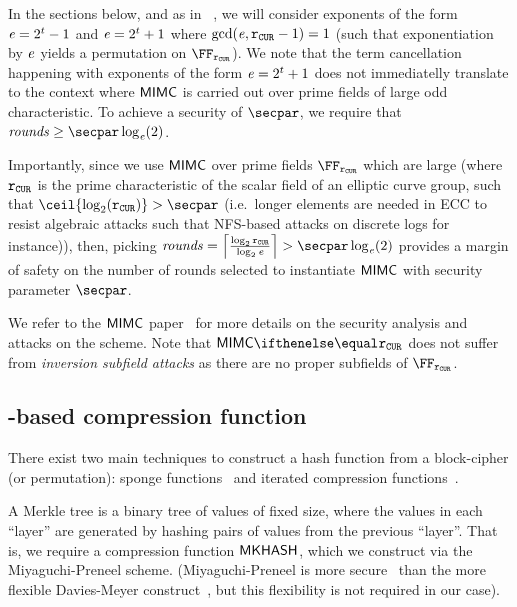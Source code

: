 \medskip

In the sections below, and as in ~\cite{albrecht2016mimc}, we will consider exponents of the form $\mathit{e}{} = 2^t-1$ and $\mathit{e}{} = 2^t+1$ where $\gcd(\mathit{e}{}, \mathtt{r_{CUR}}-1) = 1$ (such that exponentiation by $\mathit{e}{}$ yields a permutation on $\FFx{\rCURVE}$). We note that the term cancellation happening with exponents of the form $\mathit{e}{} = 2^t+1$ does not immediatelly translate to the context where $\mathsf{MIMC{}}$ is carried out over prime fields of large odd characteristic. To achieve a security of $\secpar$, we require that $\rounds \geq \secpar \log_{\exponent}(2)$.

Importantly, since we use $\mathsf{MIMC{}}$ over prime fields $\FFx{\rCURVE}$ which are large (where $\mathtt{r_{CUR}}$ is the prime characteristic of the scalar field of an elliptic curve group, such that $\ceil{\log_2(\rCURVE)} > \secpar$ (i.e.~longer elements are needed in ECC to resist algebraic attacks such that NFS-based attacks on discrete logs for instance)), then, picking $\rounds = \left\lceil \frac{\log_2 \rCURVE}{\log_2 \exponent{}} \right\rceil > \secpar \log_{\exponent}(2)$ provides a margin of safety on the number of rounds selected to instantiate $\mathsf{MIMC{}}$ with security parameter $\secpar$.

We refer to the $\mathsf{MIMC{}}$ paper~\cite[Section 4.2 and 5.1]{albrecht2016mimc} for more details on the security analysis and attacks on the scheme. Note that $\mimcPrime{\rCURVE}$ does not suffer from \emph{inversion subfield attacks} as there are no proper subfields of $\FFx{\rCURVE}$.

\subsection{\mimc{}-based compression function}\label{instantiation:mkhash:mimc-compressionf}

There exist two main techniques to construct a hash function from a block-cipher (or permutation): sponge functions~\cite{bertoni2007sponge} and iterated compression functions~\cite{black2002black}.

A Merkle tree is a binary tree of values of fixed size, where the values in each ``layer'' are generated by hashing pairs of values from the previous ``layer''. That is, we require a compression function $\mathsf{MKHASH}$, which we construct via the Miyaguchi-Preneel scheme. (Miyaguchi-Preneel is more secure~\cite[$f_5$ function]{black2002black} than the more flexible Davies-Meyer construct~\cite[Section 3]{gazzoni2006maelstrom}, but this flexibility is not required in our case).

